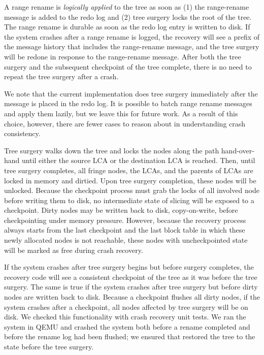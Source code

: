 A range rename is {\em logically applied} to the tree as soon as
(1) the range-rename message is added to the redo log and
(2) tree surgery locks the root of the tree.
The range rename is durable as soon as the redo log entry is written to disk.
If the system crashes after a range rename is logged, the recovery will see a
prefix of the message history that includes the range-rename message, and the
tree surgery will be redone in response to the range-rename message.
After both the tree surgery and the subsequent checkpoint of the tree complete,
there is no need to repeat the tree surgery after a crash.

We note that the current implementation does tree surgery immediately after the
message is placed in the redo log.
It is possible to batch range rename messages and apply them lazily,
but we leave this for future work.
As a result of this choice, however, there are fewer cases to reason about
in understanding crash consistency.

Tree surgery walks down the tree and locks the nodes along the path
hand-over-hand until either the source LCA or the destination LCA is reached.
Then, until tree surgery completes, all fringe nodes, the LCAs, and the parents
of LCAs are locked in memory and dirtied.
Upon tree surgery completion, these nodes will be unlocked.
Because the checkpoint process must grab the locks of all involved node before
writing them to disk,
no intermediate state of slicing will be exposed to a checkpoint.
Dirty nodes may be written back to disk, copy-on-write, before checkpointing
under memory pressure.
However, because the recovery process always starts from the last checkpoint and
the last block table in which these newly allocated nodes is not reachable,
these nodes with uncheckpointed state will be marked as free during crash
recovery.

If the system crashes after tree surgery begins but before surgery completes,
the recovery code will see a consistent checkpoint of the tree as it was
before the tree surgery.
The same is true if the system crashes after tree surgery but before dirty nodes
are written back to disk.
Because a checkpoint flushes all dirty nodes, if the system crashes after a
checkpoint, all nodes affected by tree surgery will be on disk.
We checked this functionality with crash recovery unit tests.
We ran the system in QEMU and crashed the system both before a rename completed
and before the rename log had been flushed;
we ensured that \betrfs restored the tree to the state before the tree surgery.


